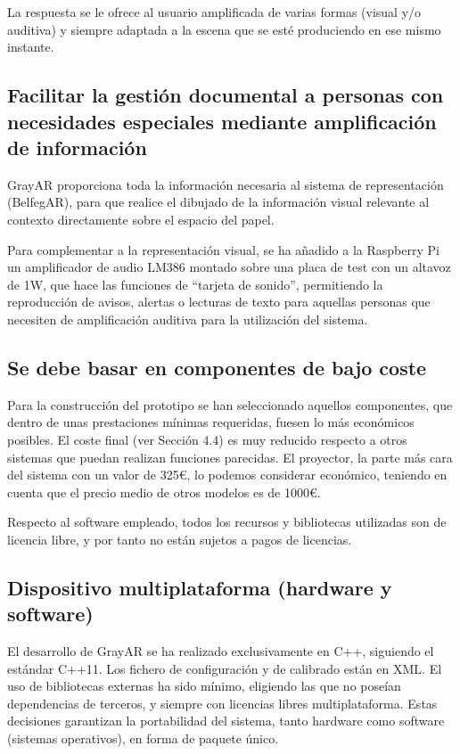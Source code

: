 La respuesta se le ofrece al usuario amplificada de varias formas (visual y/o auditiva) y siempre adaptada a la escena que se esté produciendo en ese mismo instante.

\subsection{Facilitar la gestión documental a personas con necesidades especiales mediante amplificación de información} 
GrayAR proporciona toda la información necesaria al sistema de representación (BelfegAR), para que realice el dibujado de la información visual relevante al contexto directamente sobre el espacio del papel.

Para complementar a la representación visual, se ha añadido a la Raspberry Pi un amplificador de audio LM386 montado sobre una placa de test con un altavoz de 1W, que hace las funciones de ``tarjeta de sonido'', permitiendo la reproducción de avisos, alertas o lecturas de texto para aquellas personas que necesiten de amplificación auditiva para la utilización del sistema.
  
\subsection{Se debe basar en componentes de bajo coste}
Para la construcción del prototipo se han seleccionado aquellos componentes, que dentro de unas prestaciones mínimas requeridas, fuesen lo más económicos posibles. El coste final (ver Sección 4.4) es muy reducido respecto a otros sistemas que puedan realizan funciones parecidas. El proyector, la parte más cara del sistema con un valor de 325\euro, lo podemos considerar económico, teniendo en cuenta que el precio medio de otros modelos es de 1000\euro.

Respecto al software empleado, todos los recursos y bibliotecas utilizadas son de licencia libre, y por tanto no están sujetos a pagos de licencias. 

\subsection{Dispositivo multiplataforma (hardware y software)}
El desarrollo de GrayAR se ha realizado exclusivamente en C++, siguiendo el estándar C++11. Los fichero de configuración y de calibrado están en XML. El uso de bibliotecas externas ha sido mínimo, eligiendo las que no poseían dependencias de terceros, y siempre con licencias libres multiplataforma. Estas decisiones garantizan la portabilidad del sistema, tanto hardware como software (sistemas operativos), en forma de paquete único.



